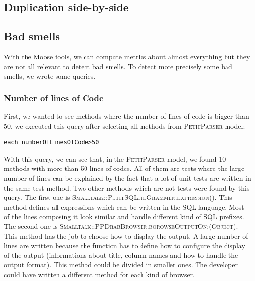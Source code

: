 \subsection{Duplication side-by-side}

\subsection{Bad smells}
With the Moose tools, we can compute metrics about almost everything but they are not all relevant to detect bad smells.  To detect more precisely some bad smells, we wrote some queries.\\

\subsubsection{Number of lines of Code}
First, we wanted to see methods where the number of lines of code is bigger than 50, we executed this query after selecting all methods from \textsc{PetitParser} model:
\begin{lstlisting}
each numberOfLinesOfCode>50
\end{lstlisting}
With this query, we can see that, in the \textsc{PetitParser} model, we found 10 methods with more than 50 lines of codes. All of them are tests where the large number of lines can be explained by the fact that a lot of unit tests are written in the same test method. Two other methods which are not tests were found by this query. The first one is \textsc{Smalltalk::PetitSQLiteGrammer.expression()}. This method defines all expressions which can be written in the SQL language. Most of the lines composing it look similar and handle different kind of SQL prefixes. The second one is \textsc{Smalltalk::PPDrabBrowser.borowseOutputOn:(Object)}. This method has the job to choose how to display the output. A large number of lines are written because the function has to define how to configure the display of the output (informations about title, column names and how to handle the output format). This method could be divided in smaller ones. The developer could have written a different method for each kind of browser. 

